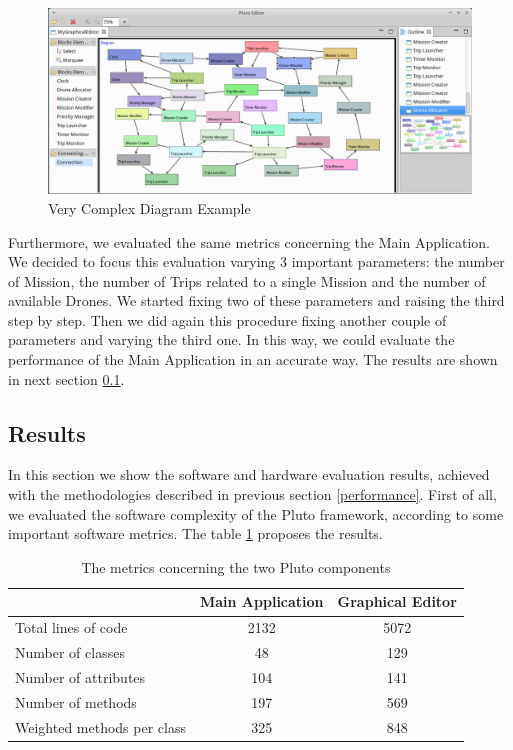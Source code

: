 \begin{figure}[H]
  \centering
  \includegraphics[width=\linewidth]{pictures/stressDiagram.png}
  \caption{Very Complex Diagram Example}
  \label{fig:stressDiagram}
\end{figure}

Furthermore, we evaluated the same metrics concerning the Main Application.
We decided to focus this evaluation varying 3 important parameters: the number of Mission, the number of Trips related to a single Mission and the number of available Drones. We started fixing two of these parameters and raising the third step by step. Then we did again this procedure fixing another couple of parameters and varying the third one. In this way, we could evaluate the performance of the Main Application in an accurate way.
The results are shown in next section \ref{metricsResult}.

\subsection{Results}
\label{metricsResult}

In this section we show the software and hardware evaluation results, achieved with the methodologies described in previous section \ref{performance}. First of all, we evaluated the software complexity of the Pluto framework, according to some important software metrics. The table \ref{table:metricsTable} proposes the results.

\begin{table}[htdp]
\centering
\begin{tabular}{|l|c|c|}
\hline
& Main Application & Graphical Editor \\
\hline
Total lines of code & 2132 & 5072 \\
\hline
Number of classes & 48 & 129 \\
\hline
Number of attributes & 104 & 141 \\
\hline
Number of methods & 197 & 569 \\
\hline
Weighted methods per class & 325 & 848 \\
\hline
\end{tabular}
\caption{The metrics concerning the two Pluto components}
\label{table:metricsTable}
\end{table}

